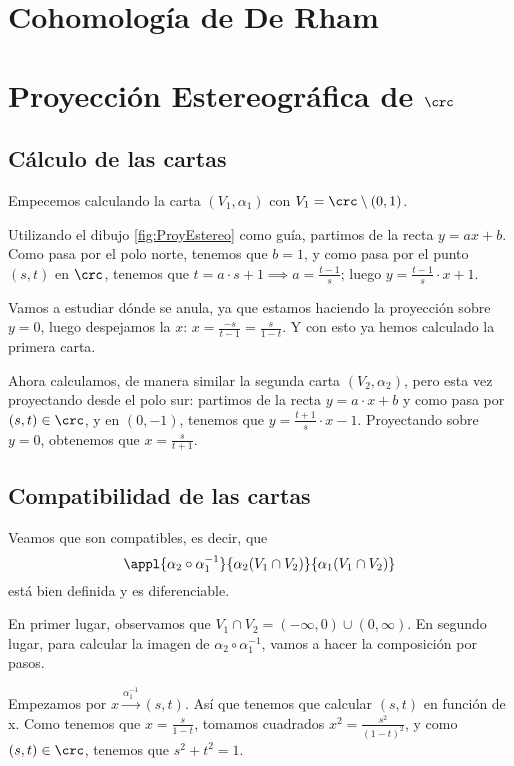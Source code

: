\documentclass[palatino]{apuntes}
\begin{document}
\chapter{Cohomología de De Rham}

\appendix
\chapter{Proyección Estereográfica de $\crc$}\label{chap:proyeccion_estereografica_crc}
\section{Cálculo de las cartas}
Empecemos calculando la carta $(V_1, \alpha_1)$ con $V_1 = \crc \setminus {(0,1)}$.

Utilizando el dibujo \ref{fig:ProyEstereo} como guía, partimos de la recta $y = ax + b$. Como pasa por el polo norte, tenemos que $b = 1$, y como pasa por el punto $(s,t)$ en $\crc$, tenemos que $t=a \cdot s + 1 \implies a = \frac{t-1}{s}$; luego $y = \frac{t-1}{s} \cdot x + 1$.

Vamos a estudiar dónde se anula, ya que estamos haciendo la proyección sobre $y=0$, luego despejamos la $x$: $x = \frac{-s}{t-1} = \frac{s}{1-t}$. Y con esto ya hemos calculado la primera carta.

Ahora calculamos, de manera similar la segunda carta $(V_2, \alpha_2)$, pero esta vez proyectando desde el polo sur: partimos de la recta $y=a \cdot x+b$ y como pasa por $(s,t) \in \crc$, y en $(0,-1)$, tenemos que $y = \frac{t+1}{s} \cdot x - 1$. Proyectando sobre $y=0$, obtenemos que $x = \frac{s}{t+1}$.

\section{Compatibilidad de las cartas}
Veamos que son compatibles, es decir, que
\[ \appl{\alpha_2 \circ \alpha_1^{-1}}{\alpha_2(V_1 \cap V_2)}{\alpha_1(V_1 \cap V_2)} \]
está bien definida y es diferenciable.

En primer lugar, observamos que $V_1 \cap V_2 = (-\infty, 0) \cup (0, \infty)$.
En segundo lugar, para calcular la imagen de $\alpha_2 \circ \alpha_1^{-1}$, vamos a hacer la composición por pasos.

Empezamos por $x \xrightarrow{\alpha_1^{-1}} (s,t)$. Así que tenemos que calcular $(s,t)$ en función de x. Como tenemos que $x = \frac{s}{1-t}$, tomamos cuadrados $x^2 = \frac{s^2}{(1-t)^2}$, y como $(s,t) \in \crc$, tenemos que $s^2+t^2=1$.
\end{document}

